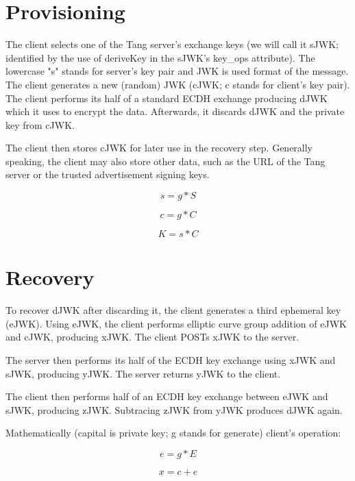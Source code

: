 \section{Provisioning}
The client selects one of the Tang server's exchange keys (we will call it sJWK; identified by the use of deriveKey in the sJWK's key\_ops attribute).
The lowercase "s" stands for server's key pair and JWK is used format of the message.
The client generates a new (random) JWK (cJWK; c stands for client's key pair).
The client performs its half of a standard ECDH exchange producing dJWK which it uses to encrypt the data.
Afterwards, it discards dJWK and the private key from cJWK.

The client then stores cJWK for later use in the recovery step.
Generally speaking, the client may also store other data, such as the URL of the Tang server or the trusted advertisement signing keys.

\begin{equation}
    s = g * S
\end{equation}

\begin{equation}
    c = g * C
\end{equation}

\begin{equation}
    K = s * C
\end{equation}

\section{Recovery}
To recover dJWK after discarding it, the client generates a third ephemeral key (eJWK).
Using eJWK, the client performs elliptic curve group addition of eJWK and cJWK, producing xJWK. The client POSTs xJWK to the server.

The server then performs its half of the ECDH key exchange using xJWK and sJWK, producing yJWK. The server returns yJWK to the client.

The client then performs half of an ECDH key exchange between eJWK and sJWK, producing zJWK. Subtracing zJWK from yJWK produces dJWK again.

Mathematically (capital is private key; g stands for generate) client's operation:

\begin{equation}
    e = g * E
\end{equation}

\begin{equation}
    x = c + e
\end{equation}

